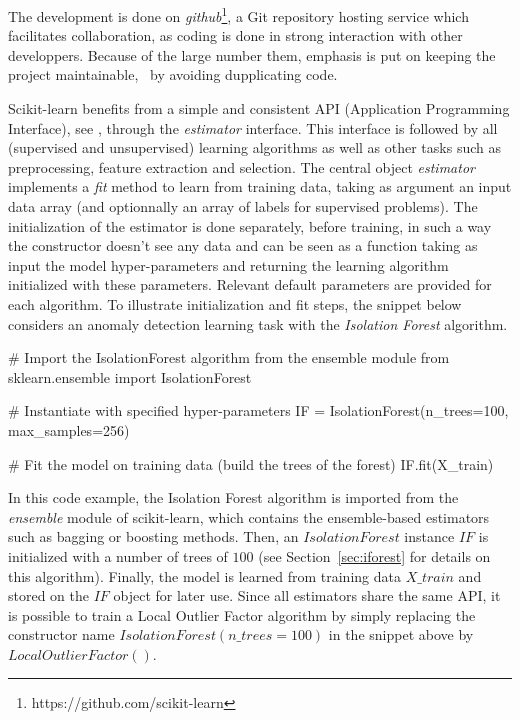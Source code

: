 The development is done on \emph{github}\footnote{https://github.com/scikit-learn}, a Git repository hosting service which facilitates collaboration, as coding is done in strong interaction with other developpers. Because of the large number them, emphasis is put on keeping the project maintainable, \eg~by avoiding dupplicating code.%


Scikit-learn benefits from a simple and consistent API (Application Programming Interface), see \cite{sklearn_api2013}, through the \emph{estimator} interface. This interface is followed by all (supervised and unsupervised) learning algorithms as well as other tasks such as preprocessing, feature extraction and selection. The central object \emph{estimator} implements a \emph{fit} method to learn from training data, taking as argument an input data array (and optionnally an array of labels for supervised problems). The initialization of the estimator is done separately, before training, in such a way the constructor doesn't see any data and can be seen as a function taking as input the model hyper-parameters and returning the learning algorithm initialized with these parameters. Relevant default parameters are provided for each algorithm. To illustrate initialization and fit steps, the snippet below considers an anomaly detection learning task with the \emph{Isolation Forest} algorithm.

\begin{pythoncode} 
# Import the IsolationForest algorithm from the ensemble module
from sklearn.ensemble import IsolationForest

# Instantiate with specified hyper-parameters
IF = IsolationForest(n_trees=100, max_samples=256)

# Fit the model on training data (build the trees of the forest)
IF.fit(X_train)
\end{pythoncode}


In this code example, the Isolation Forest algorithm is imported from the \emph{ensemble} module of scikit-learn, which contains the ensemble-based estimators such as bagging or boosting methods. Then, an $IsolationForest$ instance $IF$ is initialized with a number of trees of $100$ (see Section~\ref{sec:iforest} for details on this algorithm). Finally, the model is learned from training data $X\_train$ and stored on the $IF$ object for later use. Since all estimators share the same API, it is possible to train a Local Outlier Factor algorithm by simply replacing the constructor name $IsolationForest(n\_trees=100)$ in the snippet above by $LocalOutlierFactor()$.

